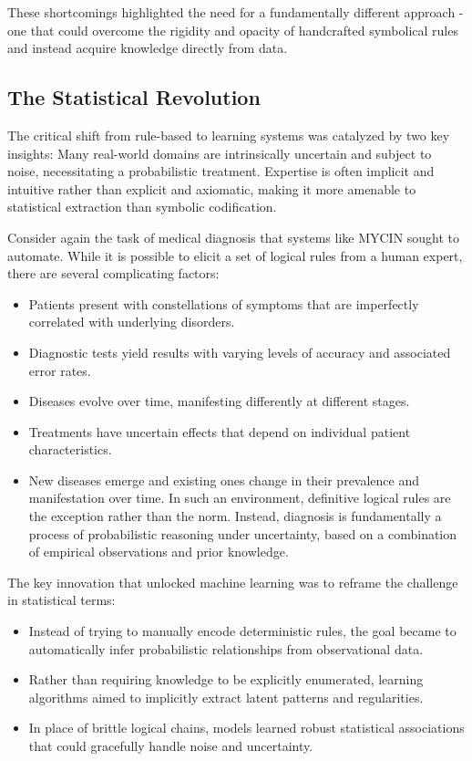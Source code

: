 \documentclass[
  9pt,
  letterpaper,
  abstract,
  titlepage]{scrbook}
\begin{document}
These shortcomings highlighted the need for a fundamentally different
approach - one that could overcome the rigidity and opacity of
handcrafted symbolical rules and instead acquire knowledge directly from
data.

\subsection{The Statistical
Revolution}\label{the-statistical-revolution}

The critical shift from rule-based to learning systems was catalyzed by
two key insights: Many real-world domains are intrinsically uncertain
and subject to noise, necessitating a probabilistic treatment. Expertise
is often implicit and intuitive rather than explicit and axiomatic,
making it more amenable to statistical extraction than symbolic
codification.

Consider again the task of medical diagnosis that systems like MYCIN
sought to automate. While it is possible to elicit a set of logical
rules from a human expert, there are several complicating factors:

\begin{itemize}
\item
  Patients present with constellations of symptoms that are imperfectly
  correlated with underlying disorders.
\item
  Diagnostic tests yield results with varying levels of accuracy and
  associated error rates.
\item
  Diseases evolve over time, manifesting differently at different
  stages.
\item
  Treatments have uncertain effects that depend on individual patient
  characteristics.
\item
  New diseases emerge and existing ones change in their prevalence and
  manifestation over time. In such an environment, definitive logical
  rules are the exception rather than the norm. Instead, diagnosis is
  fundamentally a process of probabilistic reasoning under uncertainty,
  based on a combination of empirical observations and prior knowledge.
\end{itemize}

The key innovation that unlocked machine learning was to reframe the
challenge in statistical terms:

\begin{itemize}
\item
  Instead of trying to manually encode deterministic rules, the goal
  became to automatically infer probabilistic relationships from
  observational data.
\item
  Rather than requiring knowledge to be explicitly enumerated, learning
  algorithms aimed to implicitly extract latent patterns and
  regularities.
\item
  In place of brittle logical chains, models learned robust statistical
  associations that could gracefully handle noise and uncertainty.
\end{itemize}
\end{document}
